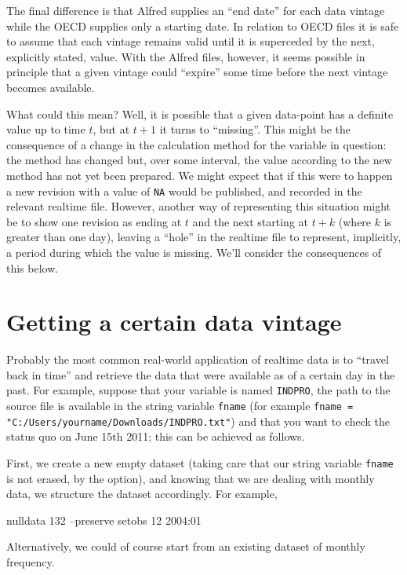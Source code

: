 The final difference is that Alfred supplies an ``end date'' for each
data vintage while the OECD supplies only a starting date. In relation
to OECD files it is safe to assume that each vintage remains valid
until it is superceded by the next, explicitly stated, value. With the
Alfred files, however, it seems possible in principle that a given
vintage could ``expire'' some time before the next vintage becomes
available.

What could this mean? Well, it is possible that a given data-point has
a definite value up to time $t$, but at $t+1$ it turns to
``missing''. This might be the consequence of a change in the
calculation method for the variable in question: the method has
changed but, over some interval, the value according to the new method
has not yet been prepared. We might expect that if this were to happen
a new revision with a value of \texttt{NA} would be published, and
recorded in the relevant realtime file. However, another way of
representing this situation might be to show one revision as ending at
$t$ and the next starting at $t+k$ (where $k$ is greater than one
day), leaving a ``hole'' in the realtime file to represent,
implicitly, a period during which the value is missing. We'll consider
the consequences of this below.

\section{Getting a certain data vintage }

Probably the most common real-world application of realtime data is to
``travel back in time'' and retrieve the data that were available as
of a certain day in the past. For example, suppose that your variable
is named \texttt{INDPRO}, the path to the source file is available in
the string variable \texttt{fname} (for example
\verb|fname = "C:/Users/yourname/Downloads/INDPRO.txt"|) and that you
want to check the status quo on June 15th 2011; this can be achieved
as follows.

First, we create a new empty dataset (taking care that our string
variable \texttt{fname} is not erased, by the 
option), and knowing that we are dealing with monthly data, we
structure the dataset accordingly. For example,
\begin{code}
nulldata 132 --preserve
setobs 12 2004:01
\end{code}

Alternatively, we could of course start from an existing dataset of
monthly frequency.

